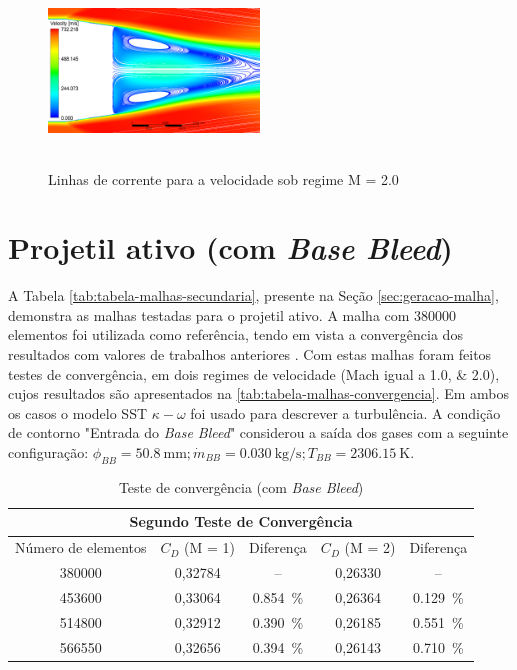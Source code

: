 \begin{figure}[!ht]
    \centering
    \includegraphics[height=5cm,width=0.5\textwidth]{corrente-velocidade-off.png}
    \caption{Linhas de corrente para a velocidade sob regime M = \num{2,0}}
    \label{fig:corrente-velocidade-sembasebleed}
\end{figure}

\section{Projetil ativo (com \textit{Base Bleed})}\label{sec:resultados-com-basebleed}

A Tabela \ref{tab:tabela-malhas-secundaria}, presente na Seção \ref{sec:geracao-malha}, demonstra as malhas testadas para o projetil ativo. A malha com \num{380000} elementos foi utilizada como referência, tendo em vista a convergência dos resultados com valores de trabalhos anteriores \cite{Mahmoud2009}. Com estas malhas foram feitos testes de convergência, em dois regimes de velocidade (Mach igual a \numlist{1,0;2,0}), cujos resultados são apresentados na \autoref{tab:tabela-malhas-convergencia}. Em ambos os casos o modelo SST $\kappa-\omega$ foi usado para descrever a turbulência. A condição de contorno "Entrada do \textit{Base Bleed}"{} considerou a saída dos gases com a seguinte configuração: $\phi_{BB} = \qty{50,8}{\milli\metre}; \Dot{m}_{BB} = \qty{0,030}{\kilogram\per\second}; T_{BB} = \qty{2306,15}{\kelvin}$.

\begin{table}[ht]
\centering
\caption[Teste de convergência (com \textit{Base Bleed})]{Teste de convergência (com \textit{Base Bleed})}
\vspace{0.5cm}
\begin{tabular}{c|c|c|c|c}
\multicolumn{5}{c}{Segundo Teste de Convergência} \\
\hline 
Número de elementos & $C_{D}$ (M = \num{1}) & Diferença & $C_{D}$ (M = \num{2}) & Diferença\\ 
\hline
\num{380000} & 0,32784 & -- & 0,26330 & --\\
\num{453600} & 0,33064 & \qty{0,854}{\percent} & 0,26364 & \qty{0,129}{\percent}\\
\num{514800} & 0,32912 & \qty{0,390}{\percent} & 0,26185 & \qty{0,551}{\percent}\\
\num{566550} & 0,32656 & \qty{0,394}{\percent} & 0,26143 & \qty{0,710}{\percent}\\
\end{tabular}
\label{tab:tabela-malhas-convergencia}
\end{table}

